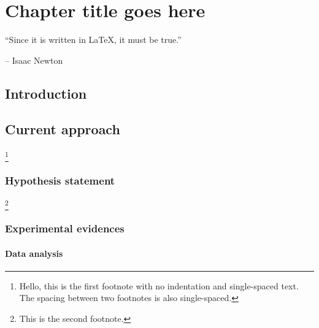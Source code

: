\chapter{Chapter title goes here} \label{chap:chap-3}


\epigraph{\enquote{Since it is written in \LaTeX, it must be true.}}{-- Isaac Newton}





\section{Introduction}
\blindtext 


\section{Current approach}
\blindtext\footnote{Hello, this is the first footnote with no indentation and single-spaced text. The spacing between two footnotes is also single-spaced.}

\subsection{Hypothesis statement}
\blindtext\footnote{This is the second footnote.}


\subsection{Experimental evidences}
\blindtext


\subsubsection{Data analysis}
\blindtext
